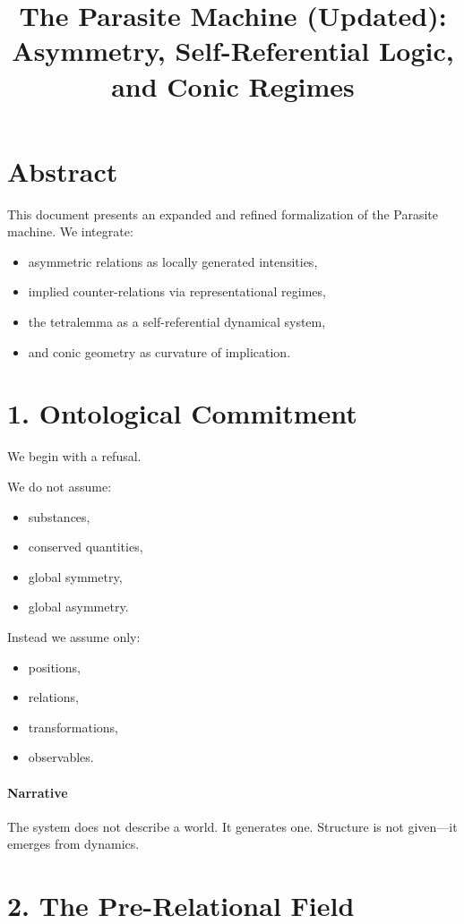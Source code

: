 \documentclass[11pt]{article}
\title{The Parasite Machine (Updated):\\
Asymmetry, Self-Referential Logic, and Conic Regimes}
\author{}
\date{}
\begin{document}
\maketitle

\section*{Abstract}
This document presents an expanded and refined formalization of the Parasite machine.
We integrate:
\begin{itemize}
\item asymmetric relations as locally generated intensities,
\item implied counter-relations via representational regimes,
\item the tetralemma as a self-referential dynamical system,
\item and conic geometry as curvature of implication.
\end{itemize}

\section{1. Ontological Commitment}

We begin with a refusal.

We do not assume:
\begin{itemize}
\item substances,
\item conserved quantities,
\item global symmetry,
\item global asymmetry.
\end{itemize}

Instead we assume only:
\begin{itemize}
\item positions,
\item relations,
\item transformations,
\item observables.
\end{itemize}

\paragraph{Narrative}
The system does not describe a world. It generates one.
Structure is not given—it emerges from dynamics.

\section{2. The Pre-Relational Field}
\end{document}
